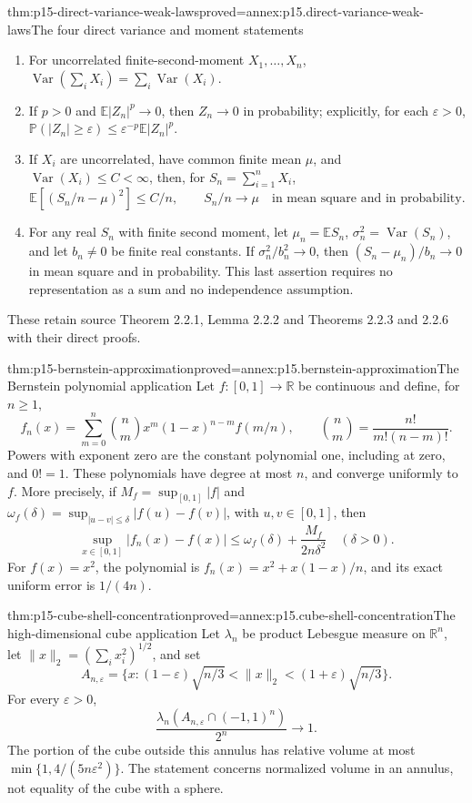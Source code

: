 \begin{hbtheorem}{thm:p15-direct-variance-weak-laws}{proved=annex:p15.direct-variance-weak-laws}{The four direct variance and moment statements}
\begin{enumerate}
\item For uncorrelated finite-second-moment \(X_1,\ldots,X_n\),
\(\operatorname{Var}(\sum_iX_i)=\sum_i\operatorname{Var}(X_i)\).
\item If \(p>0\) and \(\mathbb E|Z_n|^p\to0\), then
\(Z_n\to0\) in probability; explicitly, for each \(\varepsilon>0\),
\(\mathbb P(|Z_n|\geq\varepsilon)\leq
\varepsilon^{-p}\mathbb E|Z_n|^p\).
\item If \(X_i\) are uncorrelated, have common finite mean \(\mu\),
and \(\operatorname{Var}(X_i)\leq C<\infty\), then, for
\(S_n=\sum_{i=1}^nX_i\),
\[
 \mathbb E[(S_n/n-\mu)^2]\leq C/n,
 \qquad S_n/n\longrightarrow\mu
       \quad\text{in mean square and in probability}.
\]
\item For any real \(S_n\) with finite second moment, let
\(\mu_n=\mathbb ES_n\), \(\sigma_n^2=\operatorname{Var}(S_n)\),
and let \(b_n\ne0\) be finite real constants. If
\(\sigma_n^2/b_n^2\to0\), then
\((S_n-\mu_n)/b_n\to0\) in mean square and in probability.
This last assertion requires no representation as a sum and no
independence assumption.
\end{enumerate}
These retain source Theorem 2.2.1, Lemma 2.2.2 and Theorems 2.2.3
and 2.2.6 with their direct proofs.
\end{hbtheorem}

\begin{hbtheorem}{thm:p15-bernstein-approximation}{proved=annex:p15.bernstein-approximation}{The Bernstein polynomial application}
Let \(f:[0,1]\to\mathbb R\) be continuous and define, for \(n\geq1\),
\[
 f_n(x)=\sum_{m=0}^n\binom nm x^m(1-x)^{n-m}f(m/n),
 \qquad \binom nm=\frac{n!}{m!(n-m)!}.
\]
Powers with exponent zero are the constant polynomial one, including
at zero, and \(0!=1\). These polynomials have degree at most \(n\),
and converge uniformly to \(f\).
More precisely, if \(M_f=\sup_{[0,1]}|f|\) and
\(\omega_f(\delta)=\sup_{|u-v|\leq\delta}|f(u)-f(v)|\), with
\(u,v\in[0,1]\), then
\[
 \sup_{x\in[0,1]}|f_n(x)-f(x)|
       \leq\omega_f(\delta)+\frac{M_f}{2n\delta^2}
                        \quad(\delta>0).
\]
For \(f(x)=x^2\), the polynomial is
\(f_n(x)=x^2+x(1-x)/n\), and its exact uniform error is \(1/(4n)\).
\end{hbtheorem}

\begin{hbtheorem}{thm:p15-cube-shell-concentration}{proved=annex:p15.cube-shell-concentration}{The high-dimensional cube application}
Let \(\lambda_n\) be product Lebesgue measure on \(\mathbb R^n\),
let \(\|x\|_2=(\sum_i x_i^2)^{1/2}\), and set
\[
 A_{n,\varepsilon}=
 \{x:(1-\varepsilon)\sqrt{n/3}<\|x\|_2
                              <(1+\varepsilon)\sqrt{n/3}\}.
\]
For every \(\varepsilon>0\),
\[
 \frac{\lambda_n(A_{n,\varepsilon}\cap(-1,1)^n)}{2^n}
       \longrightarrow1.
\]
The portion of the cube outside this annulus has relative volume at most
\(\min\{1,4/(5n\varepsilon^2)\}\).
The statement concerns normalized volume in an annulus, not equality
of the cube with a sphere.
\end{hbtheorem}

